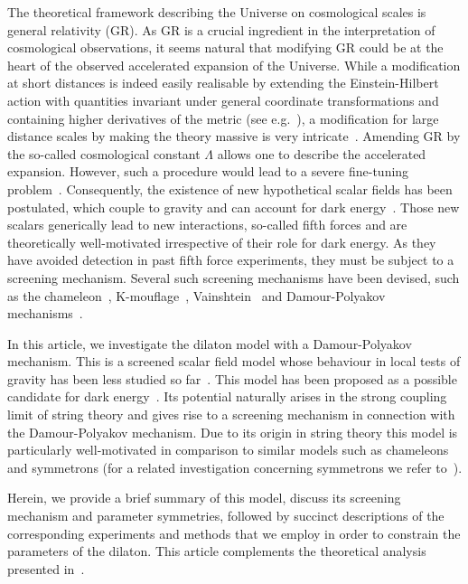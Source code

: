 \documentclass[aps,pra,twocolumn,floatfix,superscriptaddress,nofootinbib,showpacs,a4paper,balancelastpage,twoside]{revtex4-2}
\begin{document}
The theoretical framework describing the Universe on cosmological scales is general relativity (GR). As GR is a crucial ingredient in the interpretation of  cosmological observations,  it seems natural that modifying GR  could be at the heart of the  observed accelerated expansion of the Universe. While a modification at short distances is indeed easily realisable by extending the Einstein-Hilbert action with quantities invariant under general coordinate transformations and containing higher derivatives of the metric (see e.g.~\cite{Donoghue:1994dn}), a modification for large distance scales by making the theory massive is very intricate~\cite{deRham:2014zqa}. Amending GR by the so-called cosmological constant $\Lambda$ allows one to describe the accelerated expansion. However, such a procedure would lead to a severe fine-tuning problem~\cite{Sola:2013gha}. Consequently, the existence of new hypothetical scalar fields has been postulated, which couple to gravity and can account for dark energy~\cite{Joyce:2014kja}. Those new scalars generically lead to new interactions, so-called fifth forces and are theoretically well-motivated irrespective of their role for dark energy. As they have  avoided detection in past fifth force experiments, they must be subject to a  screening mechanism. Several such screening mechanisms have been devised, such as the chameleon~\cite{Khoury:2003rn,Khoury:2013tda}, K-mouflage~\cite{Brax:2012jr,Brax:2014wla}, Vainshtein~\cite{Vainshtein:1972sx} and Damour-Polyakov mechanisms~\cite{Damour:1994zq}. 

In this article, we investigate the dilaton model with a Damour-Polyakov mechanism. This is a screened scalar field model whose behaviour in local tests of gravity has been less studied so far~\cite{Damour:1994zq, Gasperini:2001pc,Damour:2002mi,Damour:2002nv,Brax:2011ja,Hartley:2018lvm,Kading:2023mdk}. This model has been proposed as a possible candidate for dark energy~\cite{Brax:2010gi,Sakstein:2014jrq}. Its potential naturally arises in the strong coupling limit of string theory and gives rise to a screening mechanism in connection with the Damour-Polyakov mechanism. Due to its origin in string theory this model is particularly well-motivated in comparison to similar models such as chameleons and symmetrons (for a related investigation concerning symmetrons we refer to~\cite{Cronenberg:2018qxf,Brax:2017hna,Pitschmann:2020ejb}). 

Herein, we provide a brief summary of this model, discuss its screening mechanism and parameter symmetries, followed by succinct descriptions of the corresponding experiments and methods that we employ in order to constrain the parameters of the dilaton. 
This article complements the theoretical analysis presented in~\cite{Brax:2022uyh}. 
\end{document}
